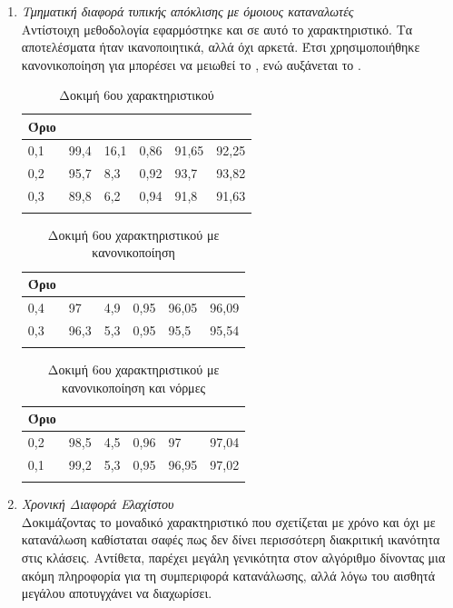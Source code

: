 \begin{enumerate}
\item{\textit{Τμηματική διαφορά τυπικής απόκλισης με όμοιους καταναλωτές}} \\
Αντίστοιχη μεθοδολογία εφαρμόστηκε και σε αυτό το χαρακτηριστικό. Τα αποτελέσματα ήταν ικανοποιητικά, αλλά όχι αρκετά. Έτσι χρησιμοποιήθηκε κανονικοποίηση για μπορέσει να μειωθεί το , ενώ αυξάνεται το .
\begin{center}
\begin{longtabu} to 0.8\textwidth { | X[c] || X[c] | X[c] | X[c] | X[c] | X[c] |  }
 \hline
  Όριο &   &  &  &  & \\
 ,1&	99,4&	16,1&	0,86&	91,65&	92,25\\
0,2&	95,7&	8,3&	0,92&	93,7&	93,82\\
0,3&	89,8&	6,2&	0,94&	91,8&	91,63\\
\hline
\caption{Δοκιμή 6ου χαρακτηριστικού}
\label{testfeat6}
\end{longtabu}
\end{center}

\begin{center}
\begin{longtabu} to 0.8\textwidth { | X[c] || X[c] | X[c] | X[c] | X[c] | X[c] |  }
 \hline
  Όριο &   &  &  &  & \\
 ,4&	97&	4,9&	0,95&	96,05&	96,09\\
0,3	&96,3&	5,3&	0,95&	95,5&	95,54\\
\hline
\caption{Δοκιμή 6ου χαρακτηριστικού με κανονικοποίηση}
\label{testfeat6normalized}
\end{longtabu}
\end{center}

\begin{center}
\begin{longtabu} to 0.8\textwidth { | X[c] || X[c] | X[c] | X[c] | X[c] | X[c] |  }
 \hline
  Όριο &   &  &  &  & \\
 ,2&	98,5&	4,5&	0,96&	97&	97,04\\
0,1&	99,2&	5,3&	0,95&	96,95&	97,02\\
\hline
\caption{Δοκιμή 6ου χαρακτηριστικού με κανονικοποίηση και νόρμες}
\label{testfeat6normalizednorms}
\end{longtabu}
\end{center}

\item{\textit{Χρονική Διαφορά Ελαχίστου}} \\
Δοκιμάζοντας το μοναδικό χαρακτηριστικό που σχετίζεται με χρόνο και όχι με κατανάλωση καθίσταται σαφές πως δεν δίνει περισσότερη διακριτική ικανότητα στις κλάσεις. Αντίθετα, παρέχει μεγάλη γενικότητα στον αλγόριθμο δίνοντας μια ακόμη πληροφορία για τη συμπεριφορά κατανάλωσης, αλλά λόγω του αισθητά μεγάλου  αποτυγχάνει να διαχωρίσει.


\end{enumerate}
